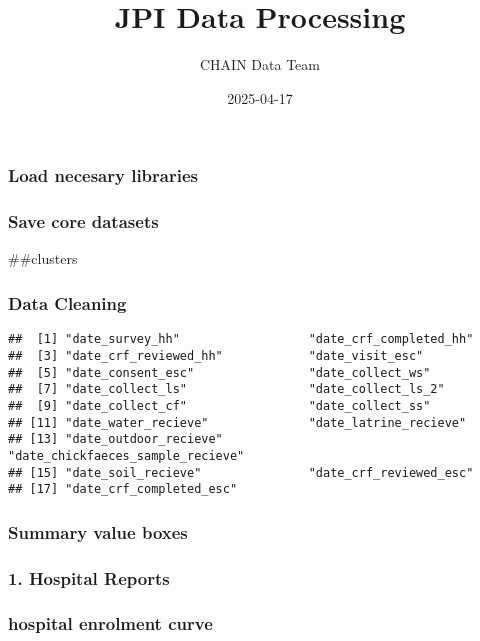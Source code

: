\documentclass[
]{article}
\title{JPI Data Processing}
\author{CHAIN Data Team}
\date{2025-04-17}
\begin{document}
\maketitle

\subsubsection{Load necesary libraries}\label{load-necesary-libraries}

\subsubsection{Save core datasets}\label{save-core-datasets}

\#\#clusters

\subsubsection{Data Cleaning}\label{data-cleaning}

\begin{verbatim}
##  [1] "date_survey_hh"                  "date_crf_completed_hh"          
##  [3] "date_crf_reviewed_hh"            "date_visit_esc"                 
##  [5] "date_consent_esc"                "date_collect_ws"                
##  [7] "date_collect_ls"                 "date_collect_ls_2"              
##  [9] "date_collect_cf"                 "date_collect_ss"                
## [11] "date_water_recieve"              "date_latrine_recieve"           
## [13] "date_outdoor_recieve"            "date_chickfaeces_sample_recieve"
## [15] "date_soil_recieve"               "date_crf_reviewed_esc"          
## [17] "date_crf_completed_esc"
\end{verbatim}

\subsubsection{Summary value boxes}\label{summary-value-boxes}

\subsubsection{1. Hospital Reports}\label{hospital-reports}

\subsubsection{hospital enrolment curve}\label{hospital-enrolment-curve}
\end{document}
